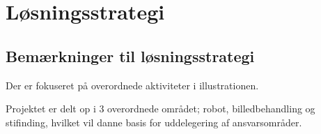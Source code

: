 \section{Løsningsstrategi}
\subsection{Bemærkninger til løsningsstrategi}
Der er fokuseret på overordnede aktiviteter i illustrationen.

Projektet er delt op i 3 overordnede området; robot, billedbehandling og stifinding, hvilket vil danne basis for uddelegering af ansvarsområder.